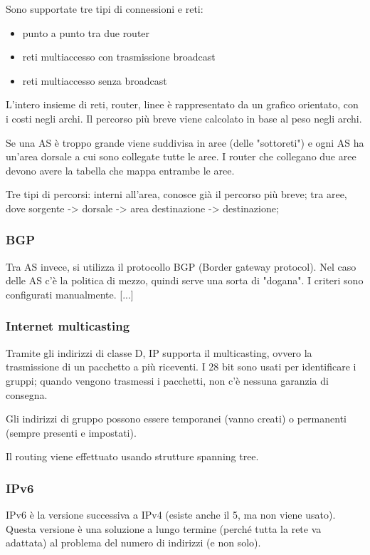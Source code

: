 Sono supportate tre tipi di connessioni e reti:
\begin{itemize}
\item punto a punto tra due router
\item reti multiaccesso con trasmissione broadcast
\item reti multiaccesso senza broadcast
\end{itemize}

L'intero insieme di reti, router, linee è rappresentato da un grafico orientato, con i costi negli archi.
Il percorso più breve viene calcolato in base al peso negli archi.

Se una AS è troppo grande viene suddivisa in aree (delle "sottoreti") e ogni AS ha un'area dorsale a cui sono collegate tutte le aree.
I router che collegano due aree devono avere la tabella che mappa entrambe le aree.

Tre tipi di percorsi: interni all'area, conosce già il percorso più breve;
tra aree, dove sorgente -> dorsale -> area destinazione -> destinazione;


\subsubsection{BGP}
Tra AS invece, si utilizza il protocollo BGP (Border gateway protocol).
Nel caso delle AS c'è la politica di mezzo, quindi serve una sorta di "dogana".
I criteri sono configurati manualmente.
[...]

\subsubsection{Internet multicasting}
Tramite gli indirizzi di classe D, IP supporta il multicasting, ovvero la trasmissione di un pacchetto a più riceventi.
I 28 bit sono usati per identificare i gruppi;
quando vengono trasmessi i pacchetti, non c'è nessuna garanzia di consegna.

Gli indirizzi di gruppo possono essere temporanei (vanno creati) o permanenti (sempre presenti e impostati).

Il routing viene effettuato usando strutture spanning tree.


\subsubsection{IPv6}
IPv6 è la versione successiva a IPv4 (esiste anche il 5, ma non viene usato).
Questa versione è una soluzione a lungo termine (perché tutta la rete va adattata) al problema del numero di indirizzi (e non solo).

